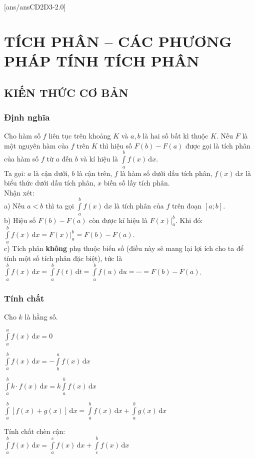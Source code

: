 [ans/ansCD2D3-2.0]
\section{TÍCH PHÂN – CÁC PHƯƠNG PHÁP TÍNH TÍCH PHÂN}
\subsection{KIẾN THỨC CƠ BẢN}
\subsubsection{Định nghĩa} Cho hàm số $f$ liên tục trên khoảng $K$ và $a,b$ là hai số bất kì thuộc $K$. Nếu $F$ là một nguyên hàm của $f$ trên $K$ thì hiệu số $F(b)-F(a)$ được gọi là tích phân của hàm số $f$ từ $a$ đến $b$ và kí hiệu là $\displaystyle\int\limits_a^b f(x)\mathrm{\,d}x$.\\
Ta gọi: $a$ là cận dưới, $b$ là cận trên, $f$ là hàm số dưới dấu tích phân, $f(x)\mathrm{\,d}x$ là biểu thức dưới dấu tích phân, $x$ biến số lấy tích phân.\\
Nhận xét:\\
a) Nếu $a<b$ thì ta gọi $\displaystyle\int\limits_a^b f(x)\mathrm{\,d}x$ là tích phân của $f$ trên đoạn $[a;b]$.\\
b) Hiệu số $F(b)-F(a)$ còn được kí hiệu là $F(x)\bigg|_a^b$. Khi đó: $\displaystyle\int\limits_a^b f(x)\mathrm{\,d}x=F(x)\bigg|_a^b=F(b)-F(a)$.\\
c) Tích phân \textbf{không} phụ thuộc biến số (điều này sẽ mang lại lợi ích cho ta để tính một số tích phân đặc biệt), tức là $\displaystyle\int\limits_a^b f(x)\mathrm{\,d}x=\displaystyle\int\limits_a^b f(t)\mathrm{\,d}t=\displaystyle\int\limits_a^b f(u)\mathrm{\,d}u=\cdots =F(b)-F(a)$.\\
\subsubsection{Tính chất} Cho $k$ là hằng số.\\
\begin{listEX}[2]
\item $\displaystyle\int\limits_a^a f(x)\mathrm{\,d}x=0$ 
\item $\displaystyle\int\limits_a^b f(x)\mathrm{\,d}x=-\displaystyle\int\limits_b^a f(x)\mathrm{\,d}x$
\item $\displaystyle\int\limits_a^b k\cdot f(x)\mathrm{\,d}x=k\displaystyle\int\limits_a^b f(x)\mathrm{\,d}x$ 
\item $\displaystyle\int\limits_a^b[f(x)+g(x)]\mathrm{\,d}x=\displaystyle\int\limits_a^b f(x)\mathrm{\,d}x+\displaystyle\int\limits_a^b g(x)\mathrm{\,d}x$
\item Tính chất chèn cận:\\
$\displaystyle\int\limits_a^b f(x)\mathrm{\,d}x=\displaystyle\int\limits_a^c f(x)\mathrm{\,d}x+\displaystyle\int\limits_c^b f(x)\mathrm{\,d}x$ 
\end{listEX}
